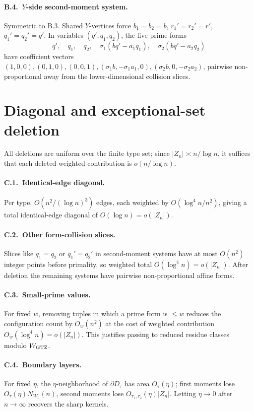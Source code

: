 \documentclass[11pt]{article}
\begin{document}
\paragraph{B.4.\ \(Y\)-side second-moment system.}
Symmetric to B.3.  Shared \(Y\)-vertices force \(b_1=b_2=b\),
\(r_1'=r_2'=r'\), \(q_1'=q_2'=q'\).  In variables \((q',q_1,q_2)\), the five
prime forms
\[
  q',\quad q_1,\quad q_2,\quad
  \sigma_1(bq'-a_1q_1),\quad
  \sigma_2(bq'-a_2q_2)
  \tag{B.18}
\]
have coefficient vectors
\(
  (1,0,0),(0,1,0),(0,0,1),(\sigma_1b,-\sigma_1a_1,0),(\sigma_2b,0,-\sigma_2a_2)
\),
pairwise non-proportional away from the lower-dimensional collision slices.

\section{Diagonal and exceptional-set deletion}

All deletions are uniform over the finite type set; since
\(|Z_n|\asymp n/\log n\), it suffices that each deleted weighted contribution
is \(o(n/\log n)\).

\paragraph{C.1.\ Identical-edge diagonal.}
Per type, \(O(n^2/(\log n)^3)\) edges, each weighted by
\(O(\log^4 n/n^2)\), giving a total identical-edge diagonal of
\(O(\log n)=o(|Z_n|)\).

\paragraph{C.2.\ Other form-collision slices.}
Slices like \(q_1=q_2\) or \(q_1'=q_2'\) in second-moment systems have at most
\(O(n^2)\) integer points before primality, so weighted total
\(O(\log^4 n)=o(|Z_n|)\).  After deletion the remaining systems have pairwise
non-proportional affine forms.

\paragraph{C.3.\ Small-prime values.}
For fixed \(w\), removing tuples in which a prime form is \(\le w\) reduces
the configuration count by \(O_w(n^2)\) at the cost of weighted contribution
\(O_w(\log^4 n)=o(|Z_n|)\).  This justifies passing to reduced residue classes
modulo \(W_{\rm GTZ}\).

\paragraph{C.4.\ Boundary layers.}
For fixed \(\eta\), the \(\eta\)-neighborhood of \(\partial D_\tau\) has area
\(O_\tau(\eta)\); first moments lose \(O_\tau(\eta)N_{W_0}(n)\), second
moments lose \(O_{\tau_1,\tau_2}(\eta)|Z_n|\).  Letting \(\eta\to0\) after
\(n\to\infty\) recovers the sharp kernels.
\end{document}

